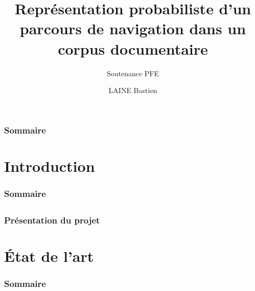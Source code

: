 \documentclass{beamer}
\title{Représentation probabiliste d’un parcours de navigation dans un corpus documentaire}
\subtitle{Soutenance PFE}
\author{LAINE Bastien}
\institute{Génie Mathématique | INSA Rouen}
\begin{document}
    \beamertemplatenavigationsymbolsempty

    \begin{frame}
        \titlepage{}
    \end{frame}

    \begin{frame}
        \frametitle{Sommaire}
        \tableofcontents[hidesubsections]
    \end{frame}


    \section{Introduction}
        \begin{frame}
            \frametitle{Sommaire}
        \end{frame}
        \subsection{}
            \begin{frame}
                \frametitle{Présentation du projet}
            \end{frame}

    \section{État de l'art}
        \begin{frame}
            \frametitle{Sommaire}
        \end{frame}
\end{document}
